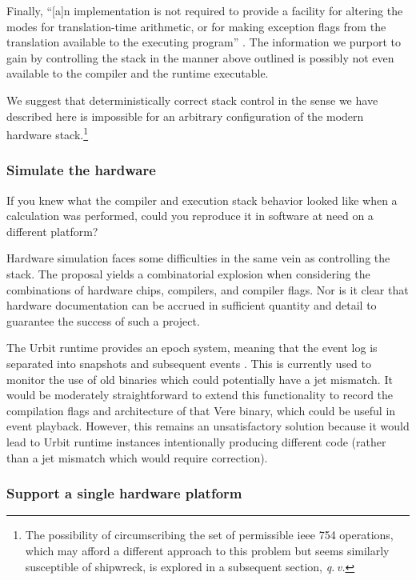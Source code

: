 \documentclass[twoside]{article}
\begin{document}
Finally, “[a]n implementation is not required to provide a facility for altering the modes for translation-time arithmetic, or for making exception flags from the translation available to the executing program” \citetext{\citet{Jones2008}, p.~200}.  The information we purport to gain by controlling the stack in the manner above outlined is possibly not even available to the compiler and the runtime executable.

We suggest that deterministically correct stack control in the sense we have described here is impossible for an arbitrary configuration of the modern hardware stack.\footnote{The possibility of circumscribing the set of permissible {\sc ieee} 754 operations, which may afford a different approach to this problem but seems similarly susceptible of shipwreck, is explored in a subsequent section, \emph{q.\,v.}}

\subsubsection{Simulate the hardware}

If you knew what the compiler and execution stack behavior looked like when a calculation was performed, could you reproduce it in software at need on a different platform?

Hardware simulation faces some difficulties in the same vein as controlling the stack.  The proposal yields a combinatorial explosion when considering the combinations of hardware chips, compilers, and compiler flags.  Nor is it clear that hardware documentation can be accrued in sufficient quantity and detail to guarantee the success of such a project.

The Urbit runtime provides an epoch system, meaning that the event log is separated into snapshots and subsequent events \citep{UrbitEpoch}.  This is currently used to monitor the use of old binaries which could potentially have a jet mismatch.  It would be moderately straightforward to extend this functionality to record the compilation flags and architecture of that Vere binary, which could be useful in event playback.  However, this remains an unsatisfactory solution because it would lead to Urbit runtime instances intentionally producing different code (rather than a jet mismatch which would require correction).

\subsubsection{Support a single hardware platform}
\end{document}
